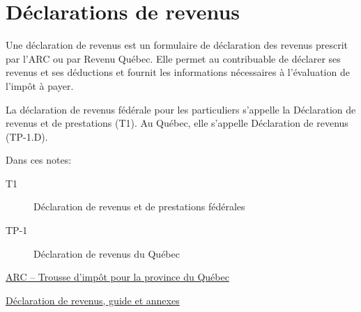 \section{Déclarations de revenus}
\begin{intro}
	Une déclaration de revenus est un formulaire de déclaration des revenus prescrit par l'ARC ou par Revenu Québec. Elle permet au contribuable de déclarer ses revenus et ses déductions et fournit les informations nécessaires à l'évaluation de l'impôt à payer. 
	
	La déclaration de revenus fédérale pour les particuliers s'appelle la Déclaration de revenus et de prestations (T1). Au Québec, elle s'appelle Déclaration de revenus (TP-1.D).
\end{intro}
\begin{note}
	Dans ces notes:
	\begin{description}
		\item[T1] Déclaration de revenus et de prestations fédérales
		\item[TP-1] Déclaration de revenus du Québec
	\end{description}
\end{note}
\href{https://www.canada.ca/fr/agence-revenu/services/formulaires-publications/trousses-impot-toutes-annees-imposition/trousse-generale-impot-prestations/quebec.html}{ARC -- Trousse d'impôt pour la province du Québec}

\href{https://www.revenuquebec.ca/fr/services-en-ligne/formulaires-et-publications/details-courant/tp-1/}{Déclaration de revenus, guide et annexes}



